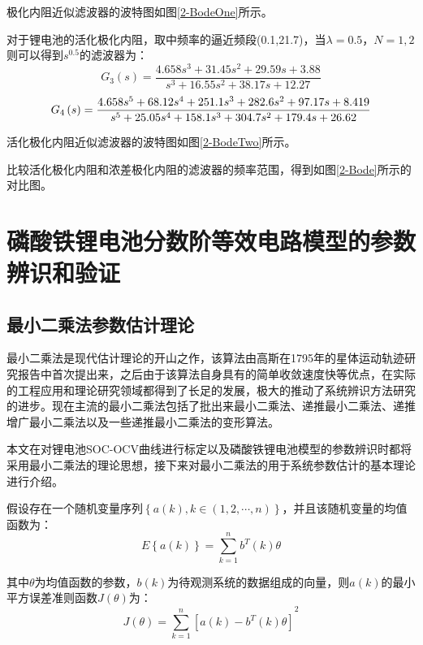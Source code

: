 极化内阻近似滤波器的波特图如图\ref{2-BodeOne}所示。

对于锂电池的活化极化内阻，取中频率的逼近频段(0.1,21.7)，当$\lambda =0.5$，$N=1,2$则可以得到${{s}^{0.5}}$的滤波器为：
\begin{equation}
{G_3}\left( s \right) = \frac{{4.658{s^3} + 31.45{s^2} + 29.59s + 3.88}}{{{s^3} + 16.55{s^2} + 38.17s + 12.27}}
\end{equation}
\begin{equation}
{G_4}\left( s \right) = \frac{{4.658{s^5} + 68.12{s^4} + 251.1{s^3} + 282.6{s^2} + 97.17s + 8.419}}{{{s^5} + 25.05{s^4} + 158.1{s^3} + 304.7{s^2} + 179.{\rm{4}}s + 26.62}}
\end{equation}

活化极化内阻近似滤波器的波特图如图\ref{2-BodeTwo}所示。

比较活化极化内阻和浓差极化内阻的滤波器的频率范围，得到如图\ref{2-Bode}所示的对比图。

\section{磷酸铁锂电池分数阶等效电路模型的参数辨识和验证}
\subsection{最小二乘法参数估计理论}
最小二乘法是现代估计理论的开山之作，该算法由高斯在1795年的星体运动轨迹研究报告中首次提出来，之后由于该算法自身具有的简单收敛速度快等优点，在实际的工程应用和理论研究领域都得到了长足的发展，极大的推动了系统辨识方法研究的进步。现在主流的最小二乘法包括了批出来最小二乘法、递推最小二乘法、递推增广最小二乘法以及一些递推最小二乘法的变形算法。

本文在对锂电池SOC-OCV曲线进行标定以及磷酸铁锂电池模型的参数辨识时都将采用最小二乘法的理论思想，接下来对最小二乘法的用于系统参数估计的基本理论进行介绍。

假设存在一个随机变量序列$\left\{ a\left( k \right),k\in \left( 1,2,\cdots ,n \right) \right\}$，并且该随机变量的均值函数为：
\begin{equation}
E\left\{ a\left( k \right) \right\}=\sum\limits_{k=1}^{n}{{{b}^{T}}\left( k \right)\theta }
\end{equation}

其中$\theta $为均值函数的参数，$b\left( k \right)$为待观测系统的数据组成的向量，则$a\left( k \right)$的最小平方误差准则函数$J\left( \theta  \right)$为：
\begin{equation}
J\left( \theta  \right)={{\sum\limits_{k=1}^{n}{\left[ a(k)-{{b}^{T}}(k)\theta  \right]}}^{2}}
\end{equation}

